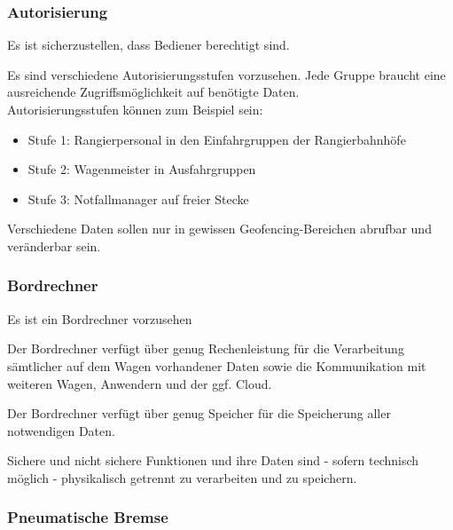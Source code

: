 \subsubsection{Autorisierung}
\begin{feat}
Es ist sicherzustellen, dass Bediener berechtigt sind.
\end{feat}
\begin{rem} [zu Anf. 41]
Es sind verschiedene Autorisierungsstufen vorzusehen. Jede Gruppe braucht eine ausreichende Zugriffsmöglichkeit auf benötigte Daten.\\
Autorisierungsstufen können zum Beispiel sein:
\begin{itemize}
    \item Stufe 1: Rangierpersonal in den Einfahrgruppen der Rangierbahnhöfe
    \item Stufe 2: Wagenmeister in Ausfahrgruppen
    \item Stufe 3: Notfallmanager auf freier Stecke
\end{itemize}
\end{rem}
\begin{rem} [zu Anf. 41]
Verschiedene Daten sollen nur in gewissen Geofencing-Bereichen abrufbar und veränderbar sein.
\end{rem}

\subsubsection{Bordrechner}
\begin{feat}
Es ist ein Bordrechner vorzusehen
\end{feat}
\begin{feat}
Der Bordrechner verfügt über genug Rechenleistung für die Verarbeitung sämtlicher auf dem Wagen vorhandener Daten sowie die Kommunikation mit weiteren Wagen, Anwendern und der ggf. Cloud.
\end{feat}
\begin{feat}
Der Bordrechner verfügt über genug Speicher für die Speicherung aller notwendigen Daten.
\end{feat}
\begin{feat}
Sichere und nicht sichere Funktionen und ihre Daten sind - sofern technisch möglich - physikalisch getrennt zu verarbeiten und zu speichern.
\end{feat}

\subsubsection{Pneumatische Bremse}
